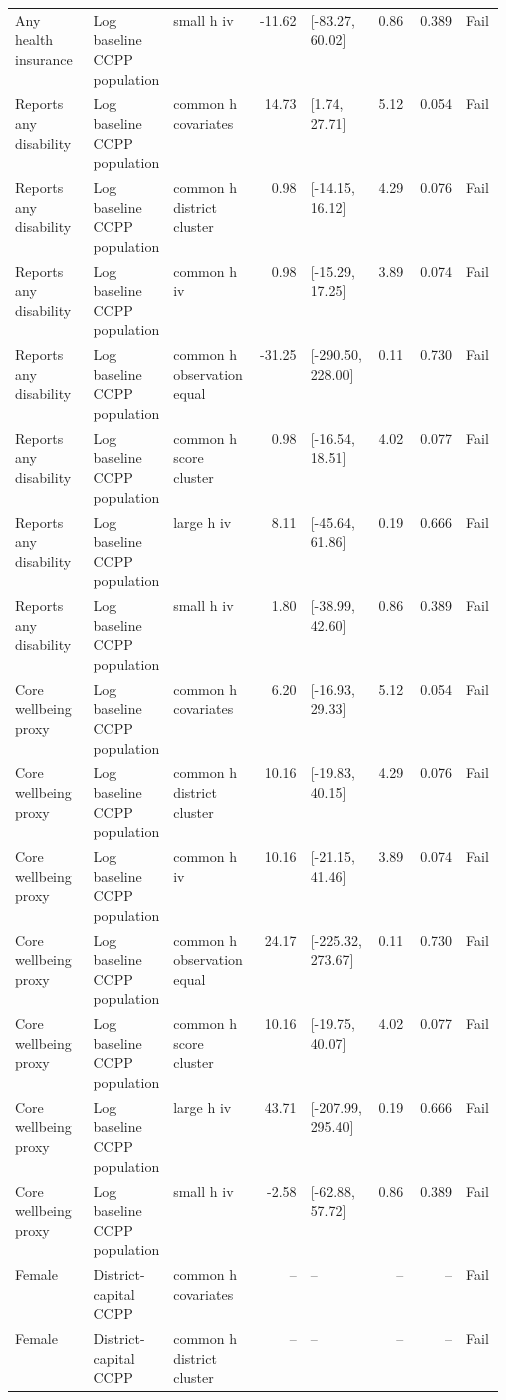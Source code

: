 \begin{longtable}{@{}p{0.16\linewidth}p{0.14\linewidth}p{0.14\linewidth}rp{0.13\linewidth}rrl@{}}
Any health insurance & Log baseline CCPP population & small h iv & -11.62 & [-83.27, 60.02] & 0.86 & 0.389 & Fail \\
Reports any disability & Log baseline CCPP population & common h covariates & 14.73 & [1.74, 27.71] & 5.12 & 0.054 & Fail \\
Reports any disability & Log baseline CCPP population & common h district cluster & 0.98 & [-14.15, 16.12] & 4.29 & 0.076 & Fail \\
Reports any disability & Log baseline CCPP population & common h iv & 0.98 & [-15.29, 17.25] & 3.89 & 0.074 & Fail \\
Reports any disability & Log baseline CCPP population & common h observation equal & -31.25 & [-290.50, 228.00] & 0.11 & 0.730 & Fail \\
Reports any disability & Log baseline CCPP population & common h score cluster & 0.98 & [-16.54, 18.51] & 4.02 & 0.077 & Fail \\
Reports any disability & Log baseline CCPP population & large h iv & 8.11 & [-45.64, 61.86] & 0.19 & 0.666 & Fail \\
Reports any disability & Log baseline CCPP population & small h iv & 1.80 & [-38.99, 42.60] & 0.86 & 0.389 & Fail \\
Core wellbeing proxy & Log baseline CCPP population & common h covariates & 6.20 & [-16.93, 29.33] & 5.12 & 0.054 & Fail \\
Core wellbeing proxy & Log baseline CCPP population & common h district cluster & 10.16 & [-19.83, 40.15] & 4.29 & 0.076 & Fail \\
Core wellbeing proxy & Log baseline CCPP population & common h iv & 10.16 & [-21.15, 41.46] & 3.89 & 0.074 & Fail \\
Core wellbeing proxy & Log baseline CCPP population & common h observation equal & 24.17 & [-225.32, 273.67] & 0.11 & 0.730 & Fail \\
Core wellbeing proxy & Log baseline CCPP population & common h score cluster & 10.16 & [-19.75, 40.07] & 4.02 & 0.077 & Fail \\
Core wellbeing proxy & Log baseline CCPP population & large h iv & 43.71 & [-207.99, 295.40] & 0.19 & 0.666 & Fail \\
Core wellbeing proxy & Log baseline CCPP population & small h iv & -2.58 & [-62.88, 57.72] & 0.86 & 0.389 & Fail \\
Female & District-capital CCPP & common h covariates & -- & -- & -- & -- & Fail \\
Female & District-capital CCPP & common h district cluster & -- & -- & -- & -- & Fail \\

\end{longtable}
